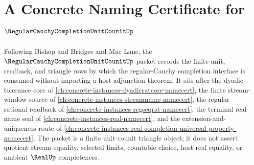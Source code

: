 \chapter{A Concrete Naming Certificate for $\RegularCauchyCompletionUnitCounitUp$}
\label{ch:concrete-instances-regular-cauchy-completion-unit-counit-namecert}

Following Bishop and Bridges and Mac Lane, the $\RegularCauchyCompletionUnitCounitUp$ packet records the finite unit, readback, and triangle rows by which the regular-Cauchy completion interface is consumed without importing a host adjunction theorem. It sits after the dyadic tolerance core of \autoref{ch:concrete-instances-dyadicratcore-namecert}, the finite stream-window source of \autoref{ch:concrete-instances-streamname-namecert}, the regular rational readback of \autoref{ch:concrete-instances-regseqrat-namecert}, the terminal real-name seal of \autoref{ch:concrete-instances-real-namecert}, and the extension-and-uniqueness route of \autoref{ch:concrete-instances-real-completion-universal-property-namecert}. The packet is a finite unit-counit triangle object; it does not assert quotient stream equality, selected limits, countable choice, host real equality, or ambient $\RealUp$ completeness.

